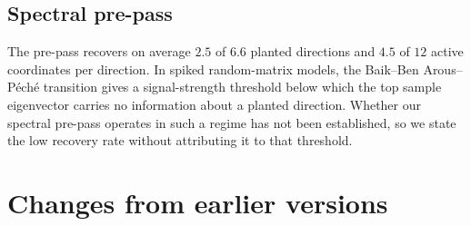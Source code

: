 \documentclass[11pt]{article}
\theoremstyle{definition}
\theoremstyle{remark}
\begin{document}
\subsection{Spectral pre-pass}
The pre-pass recovers on average $2.5$ of $6.6$ planted directions and $4.5$ of $12$ active
coordinates per direction. In spiked random-matrix models, the Baik--Ben Arous--P\'ech\'e transition
\cite{BBP2005} gives a signal-strength threshold below which the top sample eigenvector carries no
information about a planted direction. Whether our spectral pre-pass operates in such a regime has
not been established, so we state the low recovery rate without attributing it to that threshold.

\section{Changes from earlier versions}\label{app:changes}
\end{document}
